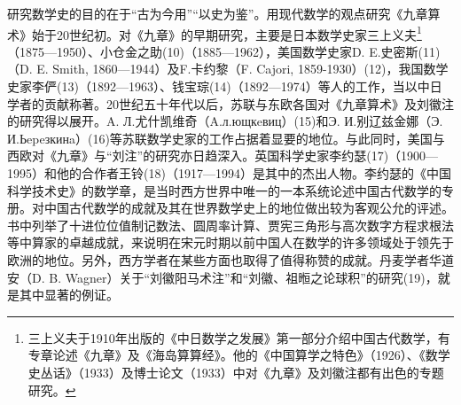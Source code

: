 \documentclass[12pt,UTF8]{ctexbook}
\begin{document}
研究数学史的目的在于“古为今用”“以史为鉴”。用现代数学的观点研究《九章算术》始于20世纪初。对《九章》的早期研究，主要是日本数学史家三上义夫\footnote{三上义夫于1910年出版的《中日数学之发展》第一部分介绍中国古代数学，有专章论述《九章》及《海岛算算经》。他的《中国算学之特色》（1926）、《数学史丛话》（1933）及博士论文（1933）中对《九章》及刘徽注都有出色的专题研究。}（1875—1950）、小仓金之助(10)（1885—1962），美国数学史家D. E.史密斯(11)（D. E. Smith, 1860—1944）及F.卡约黎（F. Cajori, 1859-1930）(12)，我国数学史家李俨(13)（1892—1963）、钱宝琮(14)（1892—1974）等人的工作，当以中日学者的贡献称著。20世纪五十年代以后，苏联与东欧各国对《九章算术》及刘徽注的研究得以展开。A. Л.尤什凯维奇（A.л.ющкeвиц）(15)和Э. И.别辽兹金娜（Э. И.Ьepeзкинa）(16)等苏联数学史家的工作占据着显要的地位。与此同时，美国与西欧对《九章》与“刘注”的研究亦日趋深入。英国科学史家李约瑟(17)（1900—1995）和他的合作者王铃(18)（1917—1994）是其中的杰出人物。李约瑟的《中国科学技术史》的数学章，是当时西方世界中唯一的一本系统论述中国古代数学的专册。对中国古代数学的成就及其在世界数学史上的地位做出较为客观公允的评述。书中列举了十进位位值制记数法、圆周率计算、贾宪三角形与高次数字方程求根法等中算家的卓越成就，来说明在宋元时期以前中国人在数学的许多领域处于领先于欧洲的地位。另外，西方学者在某些方面也取得了值得称赞的成就。丹麦学者华道安（D. B. Wagner）关于“刘徽阳马术注”和“刘徽、祖暅之论球积”的研究(19)，就是其中显著的例证。
\end{document}
